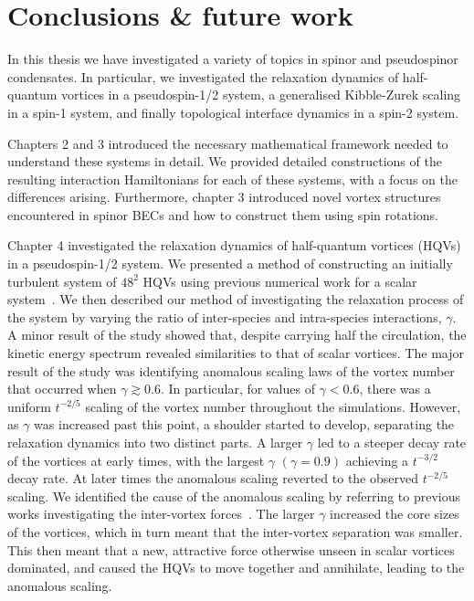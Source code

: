\chapter{Conclusions \& future work}\label{chap: conclusions}
In this thesis we have investigated a variety of topics in spinor and
pseudospinor condensates.
In particular, we investigated the relaxation dynamics of half-quantum vortices
in a pseudospin-1/2 system, a generalised Kibble-Zurek scaling in a spin-1
system, and finally topological interface dynamics in a spin-2 system.

Chapters 2 and 3 introduced the necessary mathematical framework needed to
understand these systems in detail.
We provided detailed constructions of the resulting interaction Hamiltonians for
each of these systems, with a focus on the differences arising.
Furthermore, chapter 3 introduced novel vortex structures encountered in spinor
BECs and how to construct them using spin rotations.

Chapter 4 investigated the relaxation dynamics of half-quantum vortices (HQVs)
in a pseudospin-1/2 system.
We presented a method of constructing an initially turbulent system of \(48^2\)
HQVs using previous numerical work for a scalar system~\cite{Billam2014}.
We then described our method of investigating the relaxation process of the
system by varying the ratio of inter-species and intra-species interactions,
\(\gamma \).
A minor result of the study showed that, despite carrying half the circulation,
the kinetic energy spectrum revealed similarities to that of scalar vortices.
The major result of the study was identifying anomalous scaling laws of the
vortex number that occurred when \(\gamma \gtrsim 0.6\).
In particular, for values of \(\gamma < 0.6\), there was a uniform \(t^{-2/5}\)
scaling of the vortex number throughout the simulations.
However, as \(\gamma \) was increased past this point, a shoulder started to
develop, separating the relaxation dynamics into two distinct parts.
A larger \(\gamma \) led to a steeper decay rate of the vortices at early times,
with the largest \(\gamma \) \((\gamma = 0.9)\) achieving a \(t^{-3/2}\) decay
rate.
At later times the anomalous scaling reverted to the observed \(t^{-2/5}\)
scaling.
We identified the cause of the anomalous scaling by referring to previous works
investigating the inter-vortex forces~\cite{Eto2011, Kasamatsu2016}.
The larger \(\gamma \) increased the core sizes of the vortices, which in turn
meant that the inter-vortex separation was smaller.
This then meant that a new, attractive force otherwise unseen in scalar
vortices dominated, and caused the HQVs to move together and annihilate,
leading to the anomalous scaling.

